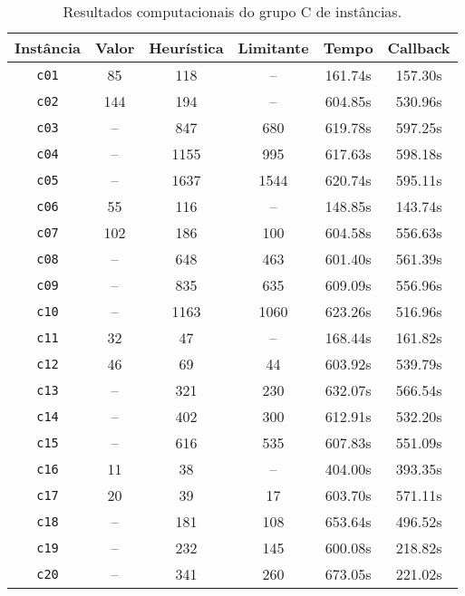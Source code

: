 \documentclass{article}
\begin{document}
\begin{table}
    \centering
    \begin{tabular}{c|c|c|c|c|c}
        Instância & Valor & Heurística & Limitante & Tempo   & Callback \\\hline
        {\tt c01} & 85    & 118        & --        & 161.74s & 157.30s  \\
        {\tt c02} & 144   & 194        & --        & 604.85s & 530.96s  \\
        {\tt c03} & --    & 847        & 680       & 619.78s & 597.25s  \\
        {\tt c04} & --    & 1155       & 995       & 617.63s & 598.18s  \\
        {\tt c05} & --    & 1637       & 1544      & 620.74s & 595.11s  \\
        {\tt c06} & 55    & 116        & --        & 148.85s & 143.74s  \\
        {\tt c07} & 102   & 186        & 100       & 604.58s & 556.63s  \\
        {\tt c08} & --    & 648        & 463       & 601.40s & 561.39s  \\
        {\tt c09} & --    & 835        & 635       & 609.09s & 556.96s  \\
        {\tt c10} & --    & 1163       & 1060      & 623.26s & 516.96s  \\
        {\tt c11} & 32    & 47         & --        & 168.44s & 161.82s  \\
        {\tt c12} & 46    & 69         & 44        & 603.92s & 539.79s  \\
        {\tt c13} & --    & 321        & 230       & 632.07s & 566.54s  \\
        {\tt c14} & --    & 402        & 300       & 612.91s & 532.20s  \\
        {\tt c15} & --    & 616        & 535       & 607.83s & 551.09s  \\
        {\tt c16} & 11    & 38         & --        & 404.00s & 393.35s  \\
        {\tt c17} & 20    & 39         & 17        & 603.70s & 571.11s  \\
        {\tt c18} & --    & 181        & 108       & 653.64s & 496.52s  \\
        {\tt c19} & --    & 232        & 145       & 600.08s & 218.82s  \\
        {\tt c20} & --    & 341        & 260       & 673.05s & 221.02s  \\
    \end{tabular}
    \caption{Resultados computacionais do grupo C de instâncias.}
    \label{tab:results-c-detailed}
\end{table}
\end{document}
